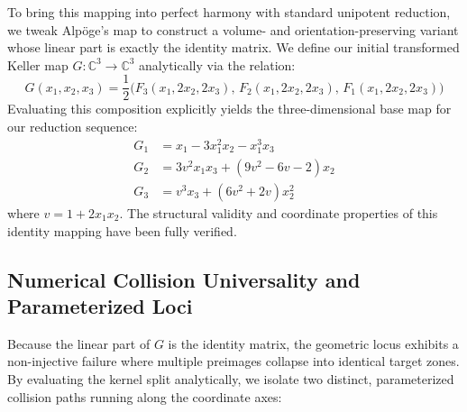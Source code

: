 \documentclass[11pt,a4paper]{article}
\begin{document}
To bring this mapping into perfect harmony with standard unipotent reduction, we tweak Alpöge's map to construct a volume- and orientation-preserving variant whose linear part is exactly the identity matrix. We define our initial transformed Keller map $G: \mathbb{C}^3 \to \mathbb{C}^3$ analytically via the relation:
\begin{equation}
G(x_1, x_2, x_3) = \frac{1}{2} \Big(F_3(x_1, 2x_2, 2x_3), \, F_2(x_1, 2x_2, 2x_3), \, F_1(x_1, 2x_2, 2x_3)\Big)
\end{equation}
Evaluating this composition explicitly yields the three-dimensional base map for our reduction sequence:
\begin{align}
G_1 &= x_1 - 3x_1^2 x_2 - x_1^3 x_3 \\
G_2 &= 3v^2 x_1 x_3 + (9v^2 - 6v - 2)x_2 \\
G_3 &= v^3 x_3 + (6v^2 + 2v)x_2^2
\end{align}
where $v = 1 + 2x_1 x_2$. The structural validity and coordinate properties of this identity mapping have been fully verified.

\subsection{Numerical Collision Universality and Parameterized Loci}

Because the linear part of $G$ is the identity matrix, the geometric locus exhibits a non-injective failure where multiple preimages collapse into identical target zones. By evaluating the kernel split analytically, we isolate two distinct, parameterized collision paths running along the coordinate axes:
\end{document}
